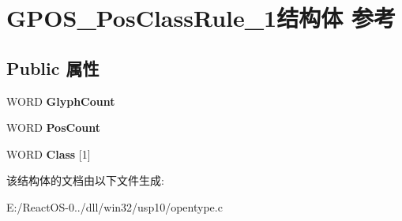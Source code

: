 \hypertarget{struct_g_p_o_s___pos_class_rule__1}{}\section{G\+P\+O\+S\+\_\+\+Pos\+Class\+Rule\+\_\+1结构体 参考}
\label{struct_g_p_o_s___pos_class_rule__1}
\subsection*{Public 属性}
\begin{DoxyCompactItemize}
\item 
\mbox{\label{struct_g_p_o_s___pos_class_rule__1_a141c5fab1b810743d37b2ef39d6dba76}} 
W\+O\+RD {\bfseries Glyph\+Count}
\item 
\mbox{\label{struct_g_p_o_s___pos_class_rule__1_aeff89aa5e1e2c26329fb781ef269aa4b}} 
W\+O\+RD {\bfseries Pos\+Count}
\item 
\mbox{\label{struct_g_p_o_s___pos_class_rule__1_af345ef4b4aaccef7da2d8c7fb626f210}} 
W\+O\+RD {\bfseries Class} \mbox{[}1\mbox{]}
\end{DoxyCompactItemize}


该结构体的文档由以下文件生成\+:\begin{DoxyCompactItemize}
\item 
E\+:/\+React\+O\+S-\/0../dll/win32/usp10/opentype.\+c\end{DoxyCompactItemize}
